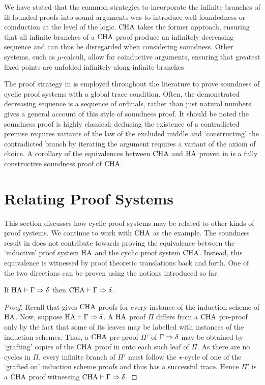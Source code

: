 We have stated that the common strategies to incorporate the
infinite branches of ill-founded proofs into sound arguments was to
introduce well-foundedness or coinduction at the level of the logic. $\mathrm{CHA}$
takes the former approach, ensuring that all infinite branches of a $\mathrm{CHA}$ proof
produce an infinitely decreasing sequence and can thus be disregarded when
considering soundness. Other systems, such as $\mu$-calculi, allow for
coinductive arguments, ensuring that greatest fixed points are unfolded
infinitely along infinite branches

The proof strategy in  is employed
throughout the literature to prove soundness of cyclic proof systems with a
global trace condition. Often, the demonstrated decreasing sequence is a
sequence of ordinals, rather than just natural numbers. \textcite[Section
4.2.1]{brotherstonSequentCalculusProof2006} gives a general account of this
style of soundness proof.  It should be noted the soundness proof
is highly classical: deducing the existence of a contradicted premise requires
variants of the law of the excluded middle and `constructing' the contradicted
branch by iterating the argument requires a variant of the axiom of choice.
A corollary of the equivalences between $\mathrm{CHA}$ and $\mathrm{HA}$ proven in \papTwo{} is
a fully constructive soundness proof of $\mathrm{CHA}$.

\section{Relating Proof Systems}
\label{sec:relating}

This section discusses how cyclic proof systems may be related to other kinds of
proof systems. We continue to work with $\mathrm{CHA}$ as the example. The soundness
result in  does not contribute towards proving the
equivalence between the `inductive' proof system $\mathrm{HA}$ and the cyclic proof
system $\mathrm{CHA}$. Instead, this equivalence is witnessed by proof theoretic
translations back and forth. One of the two directions can be proven using the
notions introduced so far.

\begin{theorem}\label{lem:ha-into-cha}
  If $\mathrm{HA} \vdash \Gamma \Rightarrow \delta$ then $\mathrm{CHA} \vdash \Gamma \Rightarrow \delta$.
\end{theorem}
\begin{proof}
  Recall that  gives $\mathrm{CHA}$ proofs for every instance of the
  induction scheme of $\mathrm{HA}$.
  Now, suppose $\mathrm{HA} \vdash \Gamma \Rightarrow \delta$. A
  $\mathrm{HA}$ proof $\Pi$ differs from a $\mathrm{CHA}$ pre-proof only by the
  fact that some of its leaves may be labelled with instances of the induction
  schemes. Thus, a $\mathrm{CHA}$ pre-proof $\Pi'$ of $\Gamma \Rightarrow \delta$ may be obtained by
  `grafting' copies of the $\mathrm{CHA}$ proof in  onto each such leaf of
  $\Pi$. As there are no cycles in $\Pi$, every infinite branch of $\Pi'$
  must follow the $\star$-cycle of one of the `grafted on' induction scheme
  proofs and thus has a successful trace. Hence $\Pi'$ is a $\mathrm{CHA}$ proof
  witnessing $\mathrm{CHA} \vdash \Gamma \Rightarrow \delta$.
\end{proof}

